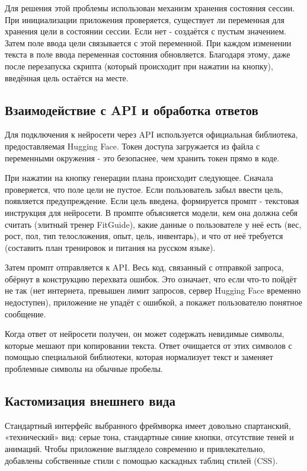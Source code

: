 \documentclass[14pt, a4paper]{extarticle}
\begin{document}
\begin{enumerate}
\medskip
\noindent Для решения этой проблемы использован механизм хранения состояния сессии. При инициализации приложения проверяется, существует ли переменная для хранения цели в состоянии сессии. Если нет - создаётся с пустым значением. Затем поле ввода цели связывается с этой переменной. При каждом изменении текста в поле ввода переменная состояния обновляется. Благодаря этому, даже после перезапуска скрипта (который происходит при нажатии на кнопку), введённая цель остаётся на месте.

\subsection{Взаимодействие с API и обработка ответов}

\noindent Для подключения к нейросети через API используется официальная библиотека, предоставляемая Hugging Face. Токен доступа загружается из файла с переменными окружения - это безопаснее, чем хранить токен прямо в коде.

\medskip
\noindent При нажатии на кнопку генерации плана происходит следующее. Сначала проверяется, что поле цели не пустое. Если пользователь забыл ввести цель, появляется предупреждение. Если цель введена, формируется промпт - текстовая инструкция для нейросети. В промпте объясняется модели, кем она должна себя считать (элитный тренер FitGuide), какие данные о пользователе у неё есть (вес, рост, пол, тип телосложения, опыт, цель, инвентарь), и что от неё требуется (составить план тренировок и питания на русском языке).

\medskip
\noindent Затем промпт отправляется к API. Весь код, связанный с отправкой запроса, обёрнут в конструкцию перехвата ошибок. Это означает, что если что-то пойдёт не так (нет интернета, превышен лимит запросов, сервер Hugging Face временно недоступен), приложение не упадёт с ошибкой, а покажет пользователю понятное сообщение.

\medskip

\noindent Когда ответ от нейросети получен, он может содержать невидимые символы, которые мешают при копировании текста. Ответ очищается от этих символов с помощью специальной библиотеки, которая нормализует текст и заменяет проблемные символы на обычные пробелы.

\subsection{Кастомизация внешнего вида}

\noindent Стандартный интерфейс выбранного фреймворка имеет довольно спартанский, «технический» вид: серые тона, стандартные синие кнопки, отсутствие теней и анимаций. Чтобы приложение выглядело современно и привлекательно, добавлены собственные стили с помощью каскадных таблиц стилей (CSS).


\end{enumerate}
\end{document}
